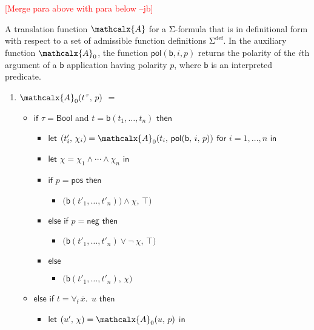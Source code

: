 \documentclass[runningheads,a4paper]{llncs}
\newcommand\return{}
\newcommand\bigtuple[1]{$\bigl(${#1}$\bigr)$}
\newcommand{\con}[1]{\mathsf{#1}}
\renewcommand\vec[1]{\overline{#1}}
\let\oldSigma=\Sigma
\def\Sigma{\mathrm{\oldSigma}}
\let\oldneg=\neg
\def\neg{\oldneg\:}
\let\oldvee=\vee
\def\vee{\mathrel{\oldvee}}
\let\oldwedge=\wedge
\def\wedge{\mathrel{\oldwedge}}
\newcommand{\conv}{\mathcalx{A}}
\newcommand{\sfundefs}[1]{#1^\mathrm{def}}
\newcommand{\ppos}{\con{pos}}
\newcommand{\pneg}{\con{neg}}
\newcommand{\pol}{\con{pol}}
\newcommand\ty[1]{\con{#1}}
\newcommand{\Bool}{\ty{Bool}}
\newcommand{\ltrue}{\top}
\newcommand{\boolop}{\con{b}}
\newcommand{\forallf}[1]{\forall_{\!#1\:}}
\newcommand{\rem}[1]{\textcolor{red}{[#1]}}
\newcommand{\jb}[1]{\rem{#1 --jb}}
\newcommand{\vthinspace}{\kern+0.083333em}
\newcommand{\typ}[1]{^{\vthinspace #1}}
\begin{document}
\jb{Merge para above with para below}

A translation function $\conv$ for a $\Sigma$-formula that is in definitional
form with respect to a set of admissible function definitions
$\sfundefs{\Sigma}$. In the auxiliary function $\conv_0$, the function $\pol(
\boolop, i, p )$ returns the polarity of the $i${th} argument of a
$\boolop$ application having polarity $p$, where $\boolop$ is an interpreted
predicate.

\begin{enumerate}
\item[\ ]
$\conv_0( t\typ{\tau},\, p )$ $=$
 \begin{itemize}
   \item[] $\mathsf{if}$ $\tau = \Bool$ and $t = \boolop(t_1,\ldots,t_n)$ $\mathsf{then}$
    \begin{itemize}
      \item[] $\mathsf{let}$ $( t'_i,\, \chi_i ) = \conv_0( t_i,\, \pol( \boolop,\, i,\, p ) )$ $\mathsf{for}$ $i = 1, \ldots, n$ $\mathsf{in}$
      \item[] $\mathsf{let}$ $\chi = \chi_1 \wedge \cdots \wedge \chi_n$ $\mathsf{in}$
      \item[] $\mathsf{if}$ $p = \ppos$ $\mathsf{then}$
      \begin{itemize}
        \item[] \return \bigtuple{$\boolop(t'_1, \ldots, t'_n) ) \wedge \chi,\, \ltrue$}
      \end{itemize}
      \item[] $\mathsf{else}$ $\mathsf{if}$ $p = \pneg$ $\mathsf{then}$
      \begin{itemize}
        \item[] \return \bigtuple{$\boolop(t'_1, \ldots, t'_n) \vee \neg \chi,\, \ltrue$}
      \end{itemize}
      \item[] $\mathsf{else}$
      \begin{itemize}
        \item[] \return \bigtuple{$\boolop(t'_1, \ldots, t'_n),\, \chi$}
      \end{itemize}
    \end{itemize}
  \item[] $\mathsf{else}$ $\mathsf{if}$ $t = \forallf{\con{f}} \vec x.\;\, u$ $\mathsf{then}$
    \begin{itemize}
      \item[] $\mathsf{let}$ $( u',\, \chi ) = \conv_0( u,\, p )$ $\mathsf{in}$

\end{itemize}
\end{itemize}
\end{enumerate}
\end{document}
